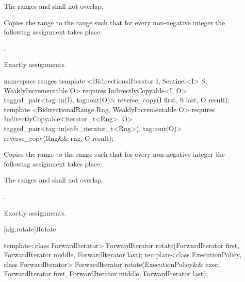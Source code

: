 \begin{itemdescr}
\pnum
\requires
The ranges
and
shall not overlap.

\pnum
\effects
Copies the range
to the range
such that
for every non-negative integer
the following assignment takes place:
.

\pnum
\returns
{}.

\pnum
\complexity
Exactly
assignments.
\end{itemdescr}

\begin{addedblock}
%
\begin{itemdecl}
namespace ranges {
  template <BidirectionalIterator I, Sentinel<I> S, WeaklyIncrementable O>
      requires IndirectlyCopyable<I, O>
    tagged_pair<tag::in(I), tag::out(O)> reverse_copy(I first, S last, O result);
  template <BidirectionalRange Rng, WeaklyIncrementable O>
      requires IndirectlyCopyable<iterator_t<Rng>, O>
    tagged_pair<tag::in(safe_iterator_t<Rng>), tag::out(O)> reverse_copy(Rng&& rng, O result);
}
\end{itemdecl}

\begin{itemdescr}
\pnum
\effects
Copies the range
to the range
such that
for every non-negative integer
the following assignment takes place:
.

\pnum
\requires
The ranges
and
shall not overlap.

\pnum
\returns
{}.

\pnum
\complexity
Exactly
assignments.
\end{itemdescr}
\end{addedblock}

[alg.rotate]{Rotate}

%
\begin{itemdecl}
template<class ForwardIterator>
  ForwardIterator
    rotate(ForwardIterator first, ForwardIterator middle, ForwardIterator last);
template<class ExecutionPolicy, class ForwardIterator>
  ForwardIterator
    rotate(ExecutionPolicy&& exec,
           ForwardIterator first, ForwardIterator middle, ForwardIterator last);
\end{itemdecl}


